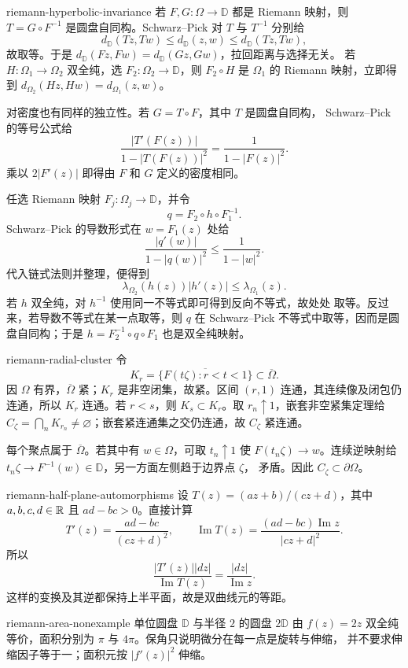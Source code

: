 \begin{solution}{riemann-hyperbolic-invariance}
若 $F,G:\Omega\to\mathbb D$ 都是 Riemann 映射，则
$T=G\circ F^{-1}$ 是圆盘自同构。Schwarz--Pick 对 $T$ 与 $T^{-1}$ 分别给
\[
 d_{\mathbb D}(Tz,Tw)\le d_{\mathbb D}(z,w)
 \le d_{\mathbb D}(Tz,Tw),
\]
故取等。于是
$d_{\mathbb D}(Fz,Fw)=d_{\mathbb D}(Gz,Gw)$，拉回距离与选择无关。
若 $H:\Omega_1\to\Omega_2$ 双全纯，选 $F_2:\Omega_2\to\mathbb D$，则
$F_2\circ H$ 是 $\Omega_1$ 的 Riemann 映射，立即得到
$d_{\Omega_2}(Hz,Hw)=d_{\Omega_1}(z,w)$。

对密度也有同样的独立性。若 \(G=T\circ F\)，其中 \(T\) 是圆盘自同构，
Schwarz--Pick 的等号公式给
\[
 \frac{|T'(F(z))|}{1-|T(F(z))|^2}
 =\frac{1}{1-|F(z)|^2}.
\]
乘以 \(2|F'(z)|\) 即得由 \(F\) 和 \(G\) 定义的密度相同。

任选 Riemann 映射 \(F_j:\Omega_j\to\mathbb D\)，并令
\[
 q=F_2\circ h\circ F_1^{-1}.
\]
Schwarz--Pick 的导数形式在 \(w=F_1(z)\) 处给
\[
 \frac{|q'(w)|}{1-|q(w)|^2}\le\frac1{1-|w|^2}.
\]
代入链式法则并整理，便得到
\[
 \lambda_{\Omega_2}(h(z))|h'(z)|
 \le\lambda_{\Omega_1}(z).
\]
若 \(h\) 双全纯，对 \(h^{-1}\) 使用同一不等式即可得到反向不等式，故处处
取等。反过来，若导数不等式在某一点取等，则 \(q\) 在 Schwarz--Pick
不等式中取等，因而是圆盘自同构；于是 \(h=F_2^{-1}\circ q\circ F_1\)
也是双全纯映射。
\end{solution}

\begin{solution}{riemann-radial-cluster}
令
\[
 K_r=\overline{\{F(t\zeta):r<t<1\}}\subset\overline\Omega.
\]
因 $\Omega$ 有界，$\overline\Omega$ 紧；$K_r$ 是非空闭集，故紧。区间
$(r,1)$ 连通，其连续像及闭包仍连通，所以 $K_r$ 连通。若 $r<s$，则
$K_s\subset K_r$。取 $r_n\uparrow1$，嵌套非空紧集定理给
$C_\zeta=\bigcap_nK_{r_n}\ne\varnothing$；嵌套紧连通集之交仍连通，故
$C_\zeta$ 紧连通。

每个聚点属于 $\overline\Omega$。若其中有 $w\in\Omega$，可取
$t_n\uparrow1$ 使 $F(t_n\zeta)\to w$。连续逆映射给
$t_n\zeta\to F^{-1}(w)\in\mathbb D$，另一方面左侧趋于边界点 $\zeta$，
矛盾。因此 $C_\zeta\subset\partial\Omega$。
\end{solution}

\begin{solution}{riemann-half-plane-automorphisms}
设 $T(z)=(az+b)/(cz+d)$，其中 $a,b,c,d\in\mathbb{R}$ 且
$ad-bc>0$。直接计算
\[
 T'(z)=\frac{ad-bc}{(cz+d)^2},
 \qquad
 \operatorname{Im}T(z)=\frac{(ad-bc)\operatorname{Im}z}{|cz+d|^2}.
\]
所以
\[
 \frac{|T'(z)||dz|}{\operatorname{Im}T(z)}
 =\frac{|dz|}{\operatorname{Im}z}.
\]
这样的变换及其逆都保持上半平面，故是双曲线元的等距。
\end{solution}

\begin{solution}{riemann-area-nonexample}
单位圆盘 $\mathbb D$ 与半径 $2$ 的圆盘 $2\mathbb D$ 由 $f(z)=2z$ 双全纯
等价，面积分别为 $\pi$ 与 $4\pi$。保角只说明微分在每一点是旋转与伸缩，
并不要求伸缩因子等于一；面积元按 $|f'(z)|^2$ 伸缩。
\end{solution}
